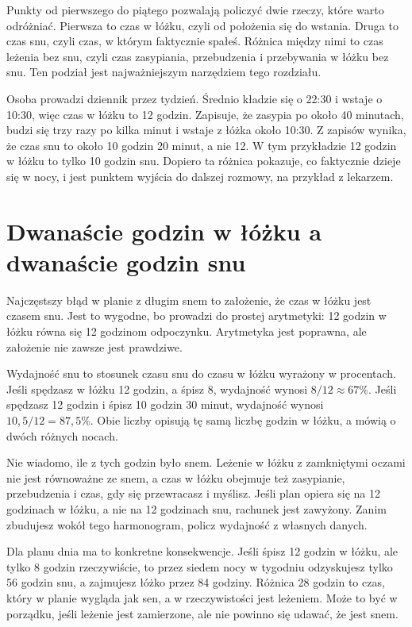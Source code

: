 Punkty od pierwszego do piątego pozwalają policzyć dwie rzeczy, które warto odróżniać. Pierwsza to czas w łóżku, czyli od położenia się do wstania. Druga to czas snu, czyli czas, w którym faktycznie spałeś. Różnica między nimi to czas leżenia bez snu, czyli czas zasypiania, przebudzenia i przebywania w łóżku bez snu. Ten podział jest najważniejszym narzędziem tego rozdziału.

\begin{przyklad}
  Osoba prowadzi dziennik przez tydzień. Średnio kładzie się o 22:30 i wstaje o 10:30, więc czas w łóżku to 12 godzin. Zapisuje, że zasypia po około 40 minutach, budzi się trzy razy po kilka minut i wstaje z łóżka około 10:30. Z zapisów wynika, że czas snu to około 10 godzin 20 minut, a nie 12. W tym przykładzie 12 godzin w łóżku to tylko 10 godzin snu. Dopiero ta różnica pokazuje, co faktycznie dzieje się w nocy, i jest punktem wyjścia do dalszej rozmowy, na przykład z lekarzem.
\end{przyklad}

\section{Dwanaście godzin w łóżku a dwanaście godzin snu}

Najczęstszy błąd w planie z długim snem to założenie, że czas w łóżku jest czasem snu. Jest to wygodne, bo prowadzi do prostej arytmetyki: 12 godzin w łóżku równa się 12 godzinom odpoczynku. Arytmetyka jest poprawna, ale założenie nie zawsze jest prawdziwe.

Wydajność snu to stosunek czasu snu do czasu w łóżku wyrażony w procentach. Jeśli spędzasz w łóżku 12 godzin, a śpisz 8, wydajność wynosi $8/12 \approx 67\%$. Jeśli spędzasz 12 godzin i śpisz 10 godzin 30 minut, wydajność wynosi $10{,}5/12 = 87{,}5\%$. Obie liczby opisują tę samą liczbę godzin w łóżku, a mówią o dwóch różnych nocach.

\begin{falle}
  Nie wiadomo, ile z tych godzin było snem. Leżenie w łóżku z zamkniętymi oczami nie jest równoważne ze snem, a czas w łóżku obejmuje też zasypianie, przebudzenia i czas, gdy się przewracasz i myślisz. Jeśli plan opiera się na 12 godzinach w łóżku, a nie na 12 godzinach snu, rachunek jest zawyżony. Zanim zbudujesz wokół tego harmonogram, policz wydajność z własnych danych.
\end{falle}

Dla planu dnia ma to konkretne konsekwencje. Jeśli śpisz 12 godzin w łóżku, ale tylko 8 godzin rzeczywiście, to przez siedem nocy w tygodniu odzyskujesz tylko 56 godzin snu, a zajmujesz łóżko przez 84 godziny. Różnica 28 godzin to czas, który w planie wygląda jak sen, a w rzeczywistości jest leżeniem. Może to być w porządku, jeśli leżenie jest zamierzone, ale nie powinno się udawać, że jest snem.

